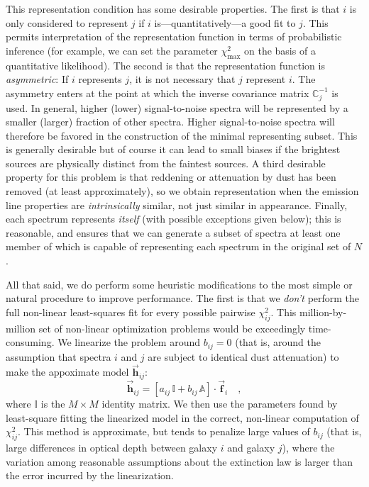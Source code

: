 \documentclass[12pt,letterpaper]{article}
\newcommand{\aij}{a_{ij}}
\newcommand{\bij}{b_{ij}}
\newcommand{\chisqij}{\chi^2_{ij}}
\newcommand{\chisqmax}{\chi^2_{\mathrm{max}}}
\newcommand{\datavec}[1]{\vec{\boldsymbol{#1}}}
\newcommand{\vfi}{\datavec{f}_{\!i}}
\newcommand{\vfapproxij}{\datavec{h}_{ij}}
\newcommand{\datamatrix}[1]{\mathbb{#1}}
\newcommand{\identity}{\datamatrix{I}}
\newcommand{\reddening}{\datamatrix{A}}
\newcommand{\invcovarj}{\datamatrix{C}^{-1}_{j}}
\begin{document}
This representation condition has some desirable properties.  The
first is that $i$ is only considered to represent $j$ if $i$
is---quantitatively---a good fit to $j$.  This permits interpretation
of the representation function in terms of probabilistic inference
(for example, we can set the parameter $\chisqmax$ on the basis of a
quantitative likelihood).  The second is that the representation
function is \emph{asymmetric}: If $i$ represents $j$, it is not
necessary that $j$ represent $i$.  The asymmetry enters at the point
at which the inverse covariance matrix $\invcovarj$ is used.  In
general, higher (lower) signal-to-noise spectra will be represented by
a smaller (larger) fraction of other spectra.  Higher signal-to-noise
spectra will therefore be favored in the construction of the minimal
representing subset.  This is generally desirable but of course it can
lead to small biases if the brightest sources are physically distinct
from the faintest sources.  A third desirable property for this
problem is that reddening or attenuation by dust has been removed (at
least approximately), so we obtain representation when the emission
line properties are \emph{intrinsically} similar, not just similar in
appearance.  Finally, each spectrum represents \emph{itself} (with
possible exceptions given below); this is reasonable, and ensures that
we can generate a subset of spectra at least one member of which is
capable of representing each spectrum in the original set of $N$.

All that said, we do perform some heuristic modifications to the most
simple or natural procedure to improve performance.  The first is that
we \emph{don't} perform the full non-linear least-squares fit for
every possible pairwise $\chisqij$.  This million-by-million set of
non-linear optimization problems would be exceedingly time-consuming.
We linearize the problem around $\bij=0$ (that is, around the
assumption that spectra $i$ and $j$ are subject to identical dust
attenuation) to make the appoximate model $\vfapproxij$:
\begin{equation}
\vfapproxij= \left[\aij\,\identity + \bij\,\reddening\right]\cdot\vfi
\quad,
\end{equation}
where $\identity$ is the $M\times M$ identity matrix.  We then use the
parameters found by least-square fitting the linearized model in the
correct, non-linear computation of $\chisqij$.  This method is
approximate, but tends to penalize large values of $\bij$ (that is,
large differences in optical depth between galaxy $i$ and galaxy $j$),
where the variation among reasonable assumptions about the extinction
law is larger than the error incurred by the linearization.
\end{document}
